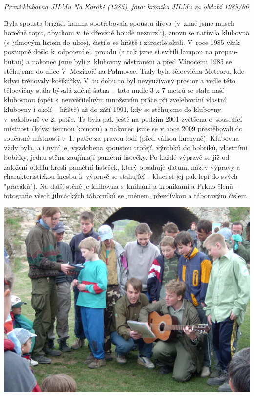 \documentclass[a5paper, 11pt, twoside]{article}
\begin{document}
\textit{První klubovna JILMu Na Korábě (1985), foto: kronika JILMu za
období 1985/86}

Byla spousta brigád, kamna spotřebovala spoustu dřeva (v~zimě jsme
museli horečně topit, abychom v~té dřevěné boudě nezmrzli), znovu se
natírala klubovna (s~jilmovým listem do ulice), čistilo se hřiště i
zarostlé okolí. V~roce 1985 však postupně došlo k~odpojení el. proudu (a
tak jsme si svítili lampou na propan-butan) a nakonec jsme byli
z~klubovny odstraněni a před Vánocemi 1985 se stěhujeme do ulice
V~Mezihoří na Palmovce. Tady byla tělocvična Meteoru, kde kdysi trénovaly
košíkářky. V~tu dobu to byl nevyužívaný prostor a vedle této tělocvičny
stála bývalá zděná šatna -- tato nudle 3 x 7 metrů se stala naší
klubovnou (opět s~neuvěřitelným množstvím práce při zvelebování vlastní
klubovny i okolí -- hřiště) až do září 1991, kdy se stěhujeme do
klubovny v~sokolovně ve 2. patře. Ta byla pak ještě na podzim 2001
zvětšena o~sousedící místnost (kdysi temnou komoru) a nakonec jsme se
v~roce 2009 přestěhovali do současné místnosti v~1. patře za pravou lodí
(před válkou kuchyně). Klubovna vždy byla, a i nyní je, vyzdobena
spoustou trofejí, výrobků do bobříků, vlastními bobříky, jednu stěnu
zaujímají pamětní lístečky. Po každé výpravě se již od založení oddílu
kreslí pamětní lísteček, který obsahuje datum, název výpravy a
charakteristickou kresbu k~výpravě se stahující -- kluci si jej pak lepí
do svých "pracáků"). Na další stěně je knihovna s~knihami a kronikami a
Prkno členů -- fotografie všech jilmáckých táborníků se jménem,
přezdívkou a táborovým číslem.

 \includegraphics[width=\textwidth]{img/78_jilm_zviretice.JPG}
\end{document}
